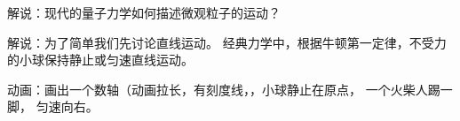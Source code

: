 
\begin{issues}
\issueDraft
\end{issues}


解说：现代的量子力学如何描述微观粒子的运动？ 


解说：为了简单我们先讨论直线运动。 经典力学中，根据牛顿第一定律，不受力的小球保持静止或匀速直线运动。

动画：画出一个数轴（动画拉长，有刻度线，，小球静止在原点， 一个火柴人踢一脚， 匀速向右。

